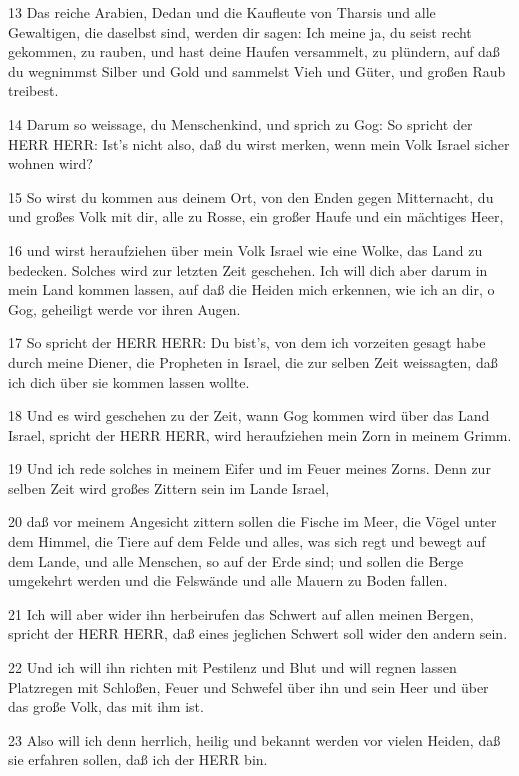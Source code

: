 \par 13 Das reiche Arabien, Dedan und die Kaufleute von Tharsis und alle Gewaltigen, die daselbst sind, werden dir sagen: Ich meine ja, du seist recht gekommen, zu rauben, und hast deine Haufen versammelt, zu plündern, auf daß du wegnimmst Silber und Gold und sammelst Vieh und Güter, und großen Raub treibest.
\par 14 Darum so weissage, du Menschenkind, und sprich zu Gog: So spricht der HERR HERR: Ist's nicht also, daß du wirst merken, wenn mein Volk Israel sicher wohnen wird?
\par 15 So wirst du kommen aus deinem Ort, von den Enden gegen Mitternacht, du und großes Volk mit dir, alle zu Rosse, ein großer Haufe und ein mächtiges Heer,
\par 16 und wirst heraufziehen über mein Volk Israel wie eine Wolke, das Land zu bedecken. Solches wird zur letzten Zeit geschehen. Ich will dich aber darum in mein Land kommen lassen, auf daß die Heiden mich erkennen, wie ich an dir, o Gog, geheiligt werde vor ihren Augen.
\par 17 So spricht der HERR HERR: Du bist's, von dem ich vorzeiten gesagt habe durch meine Diener, die Propheten in Israel, die zur selben Zeit weissagten, daß ich dich über sie kommen lassen wollte.
\par 18 Und es wird geschehen zu der Zeit, wann Gog kommen wird über das Land Israel, spricht der HERR HERR, wird heraufziehen mein Zorn in meinem Grimm.
\par 19 Und ich rede solches in meinem Eifer und im Feuer meines Zorns. Denn zur selben Zeit wird großes Zittern sein im Lande Israel,
\par 20 daß vor meinem Angesicht zittern sollen die Fische im Meer, die Vögel unter dem Himmel, die Tiere auf dem Felde und alles, was sich regt und bewegt auf dem Lande, und alle Menschen, so auf der Erde sind; und sollen die Berge umgekehrt werden und die Felswände und alle Mauern zu Boden fallen.
\par 21 Ich will aber wider ihn herbeirufen das Schwert auf allen meinen Bergen, spricht der HERR HERR, daß eines jeglichen Schwert soll wider den andern sein.
\par 22 Und ich will ihn richten mit Pestilenz und Blut und will regnen lassen Platzregen mit Schloßen, Feuer und Schwefel über ihn und sein Heer und über das große Volk, das mit ihm ist.
\par 23 Also will ich denn herrlich, heilig und bekannt werden vor vielen Heiden, daß sie erfahren sollen, daß ich der HERR bin.

